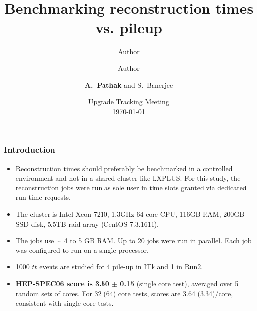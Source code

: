 \documentclass{beamer}
\title{Benchmarking reconstruction times vs. pileup} %
\author{\underline{Author} \and Author} %
\author{{\bf A.~Pathak} and S.~Banerjee}
\institute[U. Louisville] %
\date{{Upgrade Tracking Meeting}\\\today\\} %
\begin{document}
\begin{frame}
\titlepage %
\end{frame}
\begin{frame}
\frametitle{Introduction}
\vspace*{0.0cm}
\begin{center}
\begin{itemize}
\item Reconstruction times should preferably be benchmarked in a 
 controlled environment and not in a shared cluster like LXPLUS. For 
 this study, the reconstruction jobs were run  as sole user in time
slots granted via dedicated run time requests.
\item The cluster is Intel Xeon 7210, 1.3GHz 64-core CPU, 
  116GB RAM, 200GB SSD disk, 5.5TB raid array (CentOS 7.3.1611).
\item The jobs use $\sim$ 4 to 5 GB RAM. Up to 20 jobs were run in
  parallel. Each job was configured to run on a single processor. 
\item 1000 $t\bar{t}$ events are studied for 4 pile-up in ITk and 1 in Run2.
\item {\bf HEP-SPEC06 score is 3.50 $\pm$ 0.15} (single core test),
      averaged over 5 random sets of cores. For 32 (64) core tests, scores are 3.64 (3.34)/core,
      consistent with single core tests.
\end{itemize}
\end{center}
\end{frame}
\end{document}
